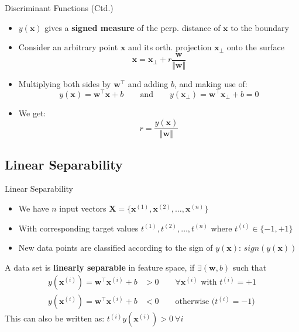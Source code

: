 \begin{frame}{Discriminant Functions (Ctd.)}{}
	\begin{itemize}
		\item $y(\bm{x})$ gives a \textbf{signed measure} of the perp. distance of $\bm{x}$ to the boundary
		\item Consider an arbitrary point $\bm{x}$ and its orth. projection $\bm{x}_{\perp}$ onto the surface
		\begin{equation}
			\bm{x} = \bm{x}_{\perp} + r \frac{\bm{w}}{\Vert \bm{w} \Vert}
		\end{equation}
		\item Multiplying both sides by $\bm{w}^{\intercal}$ and adding $b$, and making use of:
		\begin{equation*}
			y(\bm{x}) = \bm{w}^{\intercal} \bm{x} + b \qquad \text{and} \qquad
			y(\bm{x}_{\perp}) = \bm{w}^{\intercal} \bm{x}_{\perp} + b = 0			
		\end{equation*}
		\item We get:
		\begin{equation}
			r = \frac{y(\bm{x})}{\Vert \bm{w} \Vert}
		\end{equation}
	\end{itemize}
\end{frame}


\subsection{Linear Separability}

\begin{frame}{Linear Separability}{}
	\begin{itemize}
		\item We have $n$ input vectors $\bm{X} = \{ \bm{x}^{(1)}, \bm{x}^{(2)}, \dots, \bm{x}^{(n)} \}$
		\item With corresponding target values $t^{(1)}, t^{(2)}, \dots, t^{(n)}$ where $t^{(i)} \in \{-1, +1\}$
		\item New data points are classified according to the sign of $y(\bm{x})$: $sign(y(\bm{x}))$
	\end{itemize}
	
	\begin{boxBlueNoFrame}
		\footnotesize
		A data set is \textbf{linearly separable} in feature space, if $\exists (\bm{w}, b)$ such that
		\begin{align}
			y(\bm{x}^{(i)}) = \bm{w}^{\intercal} \bm{x}^{(i)} + b &> 0 \qquad
				\text{$\forall \bm{x}^{(i)}$ with $t^{(i)} = +1$} \\
			y(\bm{x}^{(i)}) = \bm{w}^{\intercal} \bm{x}^{(i)} + b &< 0 \qquad
				\text{otherwise ($t^{(i)} = -1$)}
		\end{align}
		This can also be written as: $t^{(i)} y(\bm{x}^{(i)}) > 0\ \forall i$ 
	\end{boxBlueNoFrame}
\end{frame}


